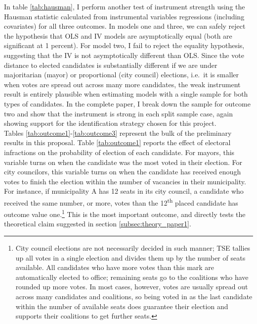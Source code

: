 \documentclass[11pt]{article}
\begin{document}
In table \ref{tab:hausman}, I perform another test of instrument strength using the Hausman statistic calculated from instrumental variables regressions (including covariates) for all three outcomes. In models one and three, we can safely reject the hypothesis that OLS and IV models are asymptotically equal (both are significant at 1 percent). For model two, I fail to reject the equality hypothesis, suggesting that the IV is not asymptotically different than OLS. Since the vote distance to elected candidates is substantially different if we are under majoritarian (mayor) or proportional (city council) elections, i.e.~it is smaller when votes are spread out across many more candidates, the weak instrument result is entirely plausible when estimating models with a single sample for both types of candidates. In the complete paper, I break down the sample for outcome two and show that the instrument is strong in each split sample case, again showing support for the identification strategy chosen for this project. \\



Tables \ref{tab:outcome1}-\ref{tab:outcome3} represent the bulk of the preliminary results in this proposal. Table \ref{tab:outcome1} reports the effect of electoral infractions on the probability of election of each candidate. For mayors, this variable turns on when the candidate was the most voted in their election. For city councilors, this variable turns on when the candidate has received enough votes to finish the election within the number of vacancies in their municipality. For instance, if municipality A has 12 seats in its city council, a candidate who received the same number, or more, votes than the 12\textsuperscript{th} placed candidate has outcome value one.\footnote{City council elections are not necessarily decided in such manner; TSE tallies up all votes in a single election and divides them up by the number of seats available. All candidates who have more votes than this mark are automatically elected to office; remaining seats go to the coalitions who have rounded up more votes. In most cases, however, votes are usually spread out across many candidates and coalitions, so being voted in as the last candidate within the number of available seats does guarantee their election and supports their coalitions to get further seats.} This is the most important outcome, and directly tests the theoretical claim suggested in section \ref{subsec:theory_paper1}.
\end{document}
